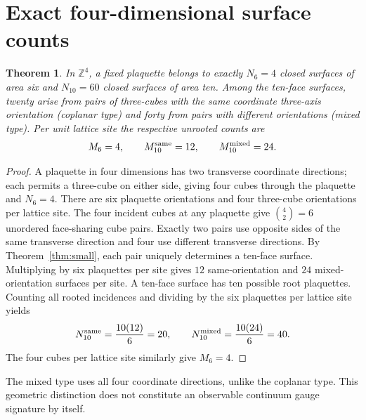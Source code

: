 \documentclass[11pt,a4paper]{article}
\newtheorem{theorem}{Theorem}
\begin{document}
\section{Exact four-dimensional surface counts}
\begin{theorem}\label{thm:counts}
In \(\mathbb Z^4\), a fixed plaquette belongs to exactly \(N_6=4\) closed surfaces of area six and \(N_{10}=60\) closed surfaces of area ten. Among the ten-face surfaces, twenty arise from pairs of three-cubes with the same coordinate three-axis orientation (coplanar type) and forty from pairs with different orientations (mixed type). Per unit lattice site the respective unrooted counts are
\[
M_6=4,\qquad M_{10}^{\rm same}=12,\qquad M_{10}^{\rm mixed}=24.
\]
\end{theorem}
\begin{proof}
A plaquette in four dimensions has two transverse coordinate directions; each permits a three-cube on either side, giving four cubes through the plaquette and \(N_6=4\). There are six plaquette orientations and four three-cube orientations per lattice site. The four incident cubes at any plaquette give \(\binom42=6\) unordered face-sharing cube pairs. Exactly two pairs use opposite sides of the same transverse direction and four use different transverse directions. By Theorem~\ref{thm:small}, each pair uniquely determines a ten-face surface. Multiplying by six plaquettes per site gives \(12\) same-orientation and \(24\) mixed-orientation surfaces per site. A ten-face surface has ten possible root plaquettes. Counting all rooted incidences and dividing by the six plaquettes per lattice site yields
\[
N_{10}^{\rm same}=\frac{10(12)}6=20,\qquad
N_{10}^{\rm mixed}=\frac{10(24)}6=40.
\]
The four cubes per lattice site similarly give \(M_6=4\).
\end{proof}
The mixed type uses all four coordinate directions, unlike the coplanar type. This geometric distinction does not constitute an observable continuum gauge signature by itself.
\end{document}
